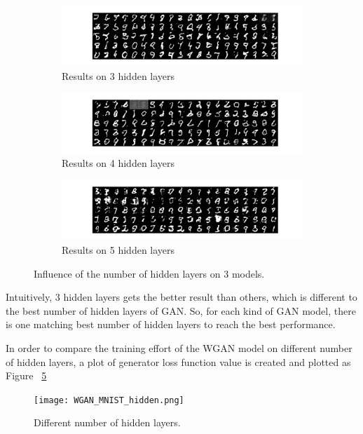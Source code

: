 \documentclass[12pt,letterpaper]{article}
\begin{document}
\begin{figure}[h]
    \begin{subfigure}{0.49\textwidth}
    \includegraphics[width=\linewidth]{WGAN_MNIST_0_100_256.png}
    \caption{\small Results on 3 hidden layers} \label{fig:a}
    \end{subfigure}\hspace*{\fill}
    \begin{subfigure}{0.49\textwidth}
    \includegraphics[width=\linewidth]{WGAN_MNIST_1_100_256.png}
    \caption{\small Results on 4 hidden layers} \label{fig:b}
    \end{subfigure}

    \medskip
    \begin{subfigure}{0.49\textwidth}
    \includegraphics[width=\linewidth]{WGAN_MNIST_2_100_256.png}
    \caption{\small Results on 5 hidden layers} \label{fig:c}
    \end{subfigure}\hspace*{\fill}
    \caption{Influence of the number of hidden layers on $3$ models.} \label{fig:MNIST_WGAN_hidden}
\end{figure}

Intuitively, 3 hidden layers gets the better result than others, which is different to the best number of hidden layers of GAN. So, for each kind of GAN model, there is one matching best number of hidden layers to reach the best performance.

In order to compare the training effort of the WGAN model on different number of hidden layers, a plot of generator loss function value is created and plotted as Figure ~\ref{fig:wgen_hidden}
\begin{figure}[h]
    \centering
    \texttt{[image: WGAN\_MNIST\_hidden.png]}
    \caption{\small Different number of hidden layers.}
    \label{fig:wgen_hidden}
\end{figure}
\end{document}
